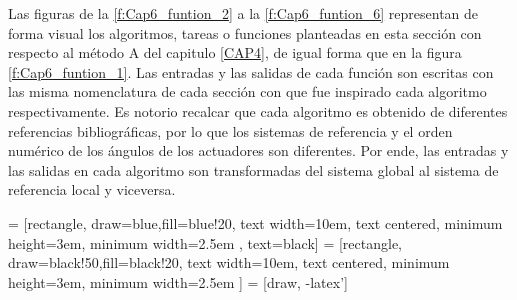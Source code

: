     Las figuras de la \eqref{f:Cap6_funtion_2} a la \eqref{f:Cap6_funtion_6} representan de forma visual los algoritmos, tareas o funciones planteadas en esta sección con respecto al método A del capitulo \eqref{CAP4}, de igual forma que en la figura \eqref{f:Cap6_funtion_1}. Las entradas y las salidas de cada función son escritas con las misma nomenclatura de cada sección con que fue inspirado cada algoritmo respectivamente. Es notorio recalcar que cada algoritmo es obtenido de diferentes referencias bibliográficas, por lo que los sistemas de referencia y el orden numérico de los ángulos de los actuadores son diferentes. Por ende, las entradas y las salidas en cada algoritmo son transformadas del sistema global al sistema de referencia local y viceversa.     
    
            \hspace{1cm}


     = [rectangle, draw=blue,fill=blue!20, text width=10em, text centered, minimum height=3em, minimum width=2.5em , text=black]
     = [rectangle, draw=black!50,fill=black!20, text width=10em, text centered, minimum height=3em, minimum width=2.5em ]
     = [draw, -latex']

